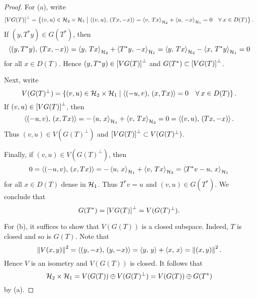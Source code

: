 \begin{proof}
    For (a), write 
    \begin{equation*}
        \left[ {VG(T)} \right]^\perp = \left\{ (v,u)\in\mathcal{H}_2\times\mathcal{H}_1 \;\middle\vert\; \left\langle {(v,u)},\, {(Tx,-x)} \right\rangle = \left\langle {v},\, {Tx} \right\rangle_{\mathcal{H}_2} + \left\langle {u},\, {-x} \right\rangle_{\mathcal{H}_1} = 0 \quad\forall\: x\in D(T) \right\}.
    \end{equation*}
    If $(y,T^*y)\in G(T^*)$, then 
    \begin{equation*}
        \left\langle {(y,T^*y)},\, {(Tx,-x)} \right\rangle = \left\langle {y},\, {Tx} \right\rangle_{\mathcal{H}_2} + \left\langle {T^*y},\, {-x} \right\rangle_{\mathcal{H}_1} 
        = \left\langle {y},\, {Tx} \right\rangle_{\mathcal{H}_2} - \left\langle {x},\, {T^*y} \right\rangle_{\mathcal{H}_1} = 0
    \end{equation*}
    for all $x\in D(T)$. Hence $(y,T^*y)\in \left[ {VG(T)} \right]^\perp$ and 
    $G(T^*) \subset \left[ {VG(T)} \right]^\perp$.  

    Next, write 
    \begin{equation*}
        V(G(T)^\perp) = \left\{ (v,u)\in\mathcal{H}_2\times\mathcal{H}_1 \;\middle\vert\; \left\langle {(-u,v)},\, {(x,Tx)} \right\rangle = 0 \quad\forall\: x\in D(T) \right\}.
    \end{equation*}
    If $(v,u)\in \left[ {VG(T)} \right]^\perp$, then 
    \begin{equation*}
        \left\langle {(-u,v)},\, {(x,Tx)} \right\rangle = -\left\langle {u},\, {x} \right\rangle_{\mathcal{H}_1} + \left\langle {v},\, {Tx} \right\rangle_{\mathcal{H}_2} = 0 
        = \left\langle {(v,u)},\, {(Tx,-x)} \right\rangle.
    \end{equation*}
    Thus $(v,u)\in V(G(T)^\perp)$ and $\left[ {VG(T)} \right]^\perp \subset V(G(T)^\perp)$. 

    Finally, if $(v,u)\in V(G(T)^\perp)$, then 
    \begin{equation*}
        0 = \left\langle {(-u,v)},\, {(x,Tx)} \right\rangle = -\left\langle {u},\, {x} \right\rangle_{\mathcal{H}_1} + \left\langle {v},\, {Tx} \right\rangle_{\mathcal{H}_2} 
        = \left\langle {T^*v - u},\, {x} \right\rangle_{\mathcal{H}_1}
    \end{equation*}
    for all $x\in D(T)$ dense in $\mathcal{H}_1$. Thus $T^*v = u$ and $(v,u)\in G(T^*)$. 
    We conclude that 
    \begin{equation*}
        G(T^*) = \left[ {VG(T)} \right]^\perp = V(G(T)^\perp).
    \end{equation*}

    For (b), it suffices to show that $V(G(T))$ is a closed subspace. Indeed, 
    $T$ is closed and so is $G(T)$. Note that 
    \begin{equation*}
        \left\lVert {V(x,y)} \right\rVert^2 = \left\langle {(y,-x)},\, {(y,-x)} \right\rangle = \left\langle {y},\, {y} \right\rangle + \left\langle {x},\, {x} \right\rangle = \left\lVert {(x,y)} \right\rVert^2.
    \end{equation*}
    Hence $V$ is an isometry and $V(G(T))$ is closed. It follows that
    \begin{equation*}
        \mathcal{H}_2\times\mathcal{H}_1 = V(G(T))\oplus V(G(T)^\perp) 
        = V(G(T))\oplus G(T^*)
    \end{equation*}
    by (a).
\end{proof}


